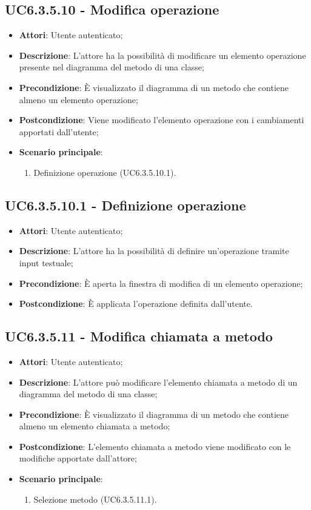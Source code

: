 \subsection{UC6.3.5.10 - Modifica operazione} 
\label{ssec:UC6.3.5.10} 
\begin{itemize} 
\item \textbf{Attori}: Utente autenticato;
\item \textbf{Descrizione}: L'attore ha la possibilità di modificare un elemento operazione presente nel diagramma del metodo di una classe;
\item \textbf{Precondizione}: È visualizzato il diagramma di un metodo che contiene almeno un elemento operazione;
\item \textbf{Postcondizione}: Viene modificato l'elemento operazione con i cambiamenti apportati dall'utente;
\item \textbf{Scenario principale}: \begin{enumerate}\item Definizione operazione (UC6.3.5.10.1). 
 \end{enumerate}
\end{itemize} 
\subsection{UC6.3.5.10.1 - Definizione operazione} 
\label{ssec:UC6.3.5.10.1} 
\begin{itemize} 
\item \textbf{Attori}: Utente autenticato;
\item \textbf{Descrizione}: L'attore ha la possibilità di definire un'operazione tramite input testuale;
\item \textbf{Precondizione}: È aperta la finestra di modifica di un elemento operazione;
\item \textbf{Postcondizione}: È applicata l'operazione definita dall'utente.
\end{itemize} 
\subsection{UC6.3.5.11 - Modifica chiamata a metodo} 
\label{ssec:UC6.3.5.11} 
\begin{itemize} 
\item \textbf{Attori}: Utente autenticato;
\item \textbf{Descrizione}: L'attore può modificare l'elemento chiamata a metodo di un diagramma del metodo di una classe;
\item \textbf{Precondizione}: È visualizzato il diagramma di un metodo che contiene almeno un elemento chiamata a metodo;
\item \textbf{Postcondizione}: L'elemento chiamata a metodo viene modificato con le modifiche apportate dall'attore;
\item \textbf{Scenario principale}: \begin{enumerate}\item Selezione metodo (UC6.3.5.11.1). 
 \end{enumerate}
\end{itemize} 
